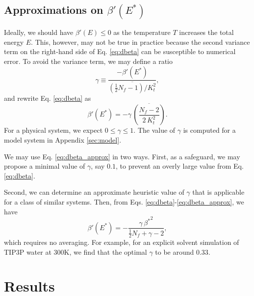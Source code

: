 \documentclass[preprint]{revtex4-1}
\begin{document}
\subsection{Approximations on $\beta'(E^*)$}


Ideally, we should have $\beta'(E) \le 0$
as the temperature $T$ increases the total energy $E$.
%
This, however, may not be true in practice
because the second variance term on the right-hand side
of Eq. \eqref{eq:dbeta}
can be susceptible to numerical error.
%
%
To avoid the variance term,
we may define a ratio
%
\begin{equation}
  \gamma
  \equiv
  \frac
  {
    -\beta'(E^*)
  }
  {
    \overline{
      \left( \frac 1 2 N_f - 1  \right) / K_t^2
    }
  }
  ,
  \label{eq:gamma_def}
\end{equation}
%
and rewrite Eq. \eqref{eq:dbeta} as
%
\begin{equation}
  \beta'(E^*)
  =
  -\gamma \, \overline{
    \left(
      \frac{ N_f - 2 }
           { 2 \, K_t^2 }
    \right)
    }
  .
  \label{eq:dbeta_approx}
\end{equation}
%
For a physical system, we expect $0 \le \gamma \le 1$.
%
The value of $\gamma$ is computed for a model system
in Appendix \ref{sec:model}.

We may use Eq. \eqref{eq:dbeta_approx} in two ways.
%
First, as a safeguard,
we may propose a minimal value of $\gamma$, say $0.1$,
to prevent an overly large value from Eq. \eqref{eq:dbeta}.

Second,
we can determine an approximate heuristic value of $\gamma$
that is applicable for a class of similar systems.
%
Then,
from Eqs. \eqref{eq:dbeta}-\eqref{eq:dbeta_approx},
we have
%
\begin{equation}
  \beta'(E^*)
  =
  -\frac{ \gamma \, {\beta^*}^2 }
  { \frac{1}{2} N_f + \gamma - 2 }
  ,
  \label{eq:dbeta_approx2}
\end{equation}
%
which requires no averaging.
%
For example,
for an explicit solvent simulation of TIP3P water\cite{jorgensen1983}
at 300K, we find that the optimal $\gamma$
to be around $0.33$.



\section{Results}
\end{document}
